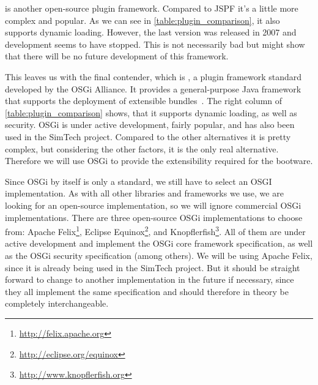  is another open-source plugin framework.
Compared to JSPF it's a little more complex and popular.
As we can see in \autoref{table:plugin_comparison}, it also supports dynamic loading.
However, the last version was released in 2007 and development seems to have stopped.
This is not necessarily bad but might show that there will be no future development of this framework.

This leaves us with the final contender, which is , a plugin framework standard developed by the OSGi Alliance.
It provides a general-purpose Java framework that supports the deployment of extensible bundles~\autocite{osgi:spec}.
The right column of \autoref{table:plugin_comparison} shows, that it supports dynamic loading, as well as security.
OSGi is under active development, fairly popular, and has also been used in the SimTech project.
Compared to the other alternatives it is pretty complex, but considering the other factors, it is the only real alternative.
Therefore we will use OSGi to provide the extensibility required for the bootware.

Since OSGi by itself is only a standard, we still have to select an OSGI implementation.
As with all other libraries and frameworks we use, we are looking for an open-source implementation, so we will ignore commercial OSGi implementations.
There are three open-source OSGi implementations to choose from: Apache Felix\footnote{\url{http://felix.apache.org}}, Eclipse Equinox\footnote{\url{http://eclipse.org/equinox}}, and Knopflerfish\footnote{\url{http://www.knopflerfish.org}}.
All of them are under active development and implement the OSGi core framework specification, as well as the OSGi security specification (among others).
We will be using Apache Felix, since it is already being used in the SimTech project.
But it should be straight forward to change to another implementation in the future if necessary, since they all implement the same specification and should therefore in theory be completely interchangeable.
